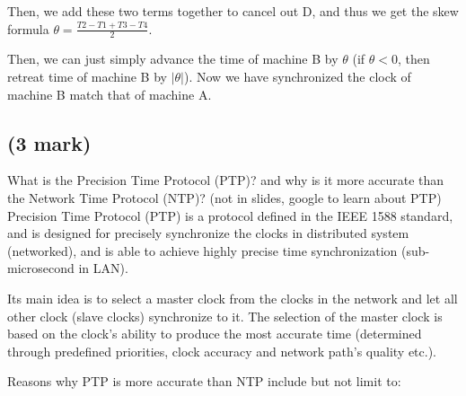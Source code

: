 \documentclass[11pt]{article}
\begin{document}
Then, we add these two terms together to cancel out D, and thus we get the skew formula \underline{$\theta = \frac{T2-T1+T3-T4}{2}$}.

	

Then, we can just simply advance the time of machine B by $\theta$ (if $\theta <0$, then retreat time of machine B by $|\theta|$). Now we have synchronized the clock of machine B match that of machine A.

\newpage
\subsection{(3 mark)}
What is the Precision Time Protocol (PTP)? and why is it more accurate than the Network Time Protocol (NTP)? (not in slides, google to learn about PTP)\\

Precision Time Protocol (PTP) is a protocol defined in the IEEE 1588 standard, and is designed for precisely synchronize the clocks in distributed system (networked), and is able to achieve highly precise time synchronization (sub-microsecond in LAN).

Its main idea is to select a master clock from the clocks in the network and let all other clock (slave clocks) synchronize to it. The selection of the master clock is based on the clock's ability to produce the most accurate time (determined through predefined priorities, clock accuracy and network path's quality etc.).

Reasons why PTP is more accurate than NTP include but not limit to:
\end{document}

